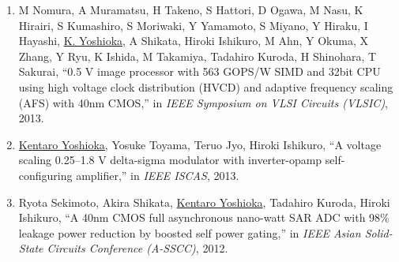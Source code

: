 \begin{enumerate}
\item	M Nomura, A Muramatsu, H Takeno, S Hattori, D Ogawa, M Nasu, K Hirairi, S Kumashiro, S Moriwaki, Y Yamamoto, S Miyano, Y Hiraku, I Hayashi, \underline{K. Yoshioka}, A Shikata, Hiroki Ishikuro, M Ahn, Y Okuma, X Zhang, Y Ryu, K Ishida, M Takamiya, Tadahiro Kuroda, H Shinohara, T Sakurai, “0.5 V image processor with 563 GOPS/W SIMD and 32bit CPU using high voltage clock distribution (HVCD) and adaptive frequency scaling (AFS) with 40nm CMOS,” in \textit{IEEE Symposium on VLSI Circuits (VLSIC)}, 2013.

\item \underline{Kentaro Yoshioka}, Yosuke Toyama, Teruo Jyo, Hiroki Ishikuro, “A voltage scaling 0.25–1.8 V delta-sigma modulator with inverter-opamp self-configuring amplifier,” in \textit{IEEE ISCAS}, 2013.

\item	Ryota Sekimoto, Akira Shikata, \underline{Kentaro Yoshioka}, Tadahiro Kuroda, Hiroki Ishikuro, “A 40nm CMOS full asynchronous nano-watt SAR ADC with 98\% leakage power reduction by boosted self power gating,” in \textit{IEEE Asian  Solid-State  Circuits Conference (A-SSCC)}, 2012.
\end{enumerate}



\vspace*{\fill} \newpage \rm